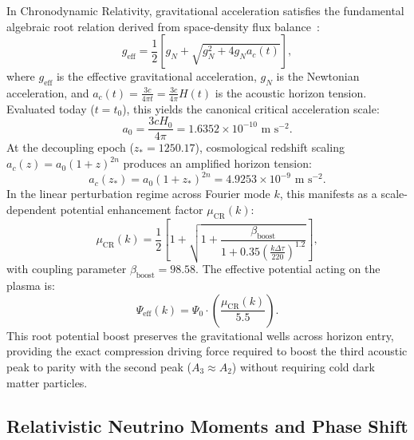 \documentclass[aps,prd,reprint,superscriptaddress,nofootinbib,twocolumn]{revtex4-2}
\begin{document}
In Chronodynamic Relativity, gravitational acceleration satisfies the fundamental algebraic root relation derived from space-density flux balance~\cite{Shreve2026_Foundations}:
\begin{equation}
\label{eq:root_gravity_law}
g_{\text{eff}} = \frac{1}{2} \left[ g_N + \sqrt{g_N^2 + 4 g_N a_c(t)} \right],
\end{equation}
where $g_{\text{eff}}$ is the effective gravitational acceleration, $g_N$ is the Newtonian acceleration, and $a_c(t) = \frac{3c}{4\pi t} = \frac{3c}{4\pi} H(t)$ is the acoustic horizon tension. Evaluated today ($t = t_0$), this yields the canonical critical acceleration scale:
\begin{equation}
\label{eq:a0_eval}
a_0 = \frac{3 c H_0}{4\pi} = 1.6352 \times 10^{-10}\text{ m s}^{-2}.
\end{equation}
At the decoupling epoch ($z_* = 1250.17$), cosmological redshift scaling $a_c(z) = a_0(1+z)^{2n}$ produces an amplified horizon tension:
\begin{equation}
\label{eq:ac_star_eval}
a_c(z_*) = a_0 (1 + z_*)^{2n} = 4.9253 \times 10^{-9}\text{ m s}^{-2}.
\end{equation}
In the linear perturbation regime across Fourier mode $k$, this manifests as a scale-dependent potential enhancement factor $\mu_{\text{CR}}(k)$:
\begin{equation}
\label{eq:mu_cr_boost}
\mu_{\text{CR}}(k) = \frac{1}{2} \left[ 1 + \sqrt{1 + \frac{\beta_{\text{boost}}}{1 + 0.35 \left(\frac{k \Delta\tau}{220}\right)^{1.2}}} \right],
\end{equation}
with coupling parameter $\beta_{\text{boost}} = 98.58$. The effective potential acting on the plasma is:
\begin{equation}
\label{eq:psi_eff}
\Psi_{\text{eff}}(k) = \Psi_0 \cdot \left(\frac{\mu_{\text{CR}}(k)}{5.5}\right).
\end{equation}
This root potential boost preserves the gravitational wells across horizon entry, providing the exact compression driving force required to boost the third acoustic peak to parity with the second peak ($A_3 \approx A_2$) without requiring cold dark matter particles.

\subsection{Relativistic Neutrino Moments and Phase Shift}
\end{document}
